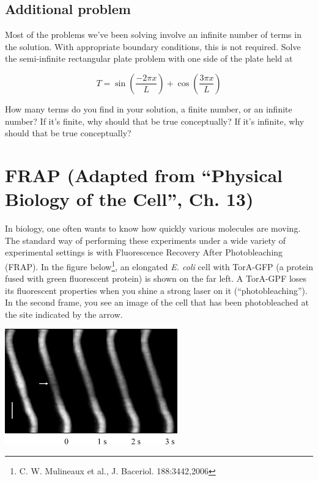 \documentclass[12pt]{article}
\begin{document}
\subsection{Additional problem} Most of the problems we've been solving involve an infinite number of terms in the solution. With appropriate boundary conditions, this is not required. Solve the semi-infinite rectangular plate problem with one side of the plate held at

\begin{equation}
  T = \sin\left(\frac{-2\pi x}{L}\right) + \cos\left(\frac{3\pi x}{L}\right)
\end{equation}

How many terms do you find in your solution, a finite number, or an infinite number? If it's finite, why should that be true conceptually? If it's infinite, why should that be true conceptually?


\section{FRAP (Adapted from ``Physical Biology of the Cell'', Ch. 13)}
In biology, one often wants to know how quickly various molecules are
moving. The standard way of performing these experiments under a wide
variety of experimental settings is with Fluorescence Recovery After
Photobleaching (FRAP). In the figure below\footnote{C. W. Mulineaux et
al., J. Baceriol. 188:3442,2006}, an elongated
\textit{E. coli} cell with TorA-GFP (a protein fused with green
fluorescent protein) is shown on the far left. A TorA-GPF loses its
fluorescent properties when you shine a strong laser on it
(``photobleaching''). In the second frame, you see an image of the
cell that has been photobleached at the site indicated by the
arrow. 

\includegraphics[height=50mm]{F5_large.pdf}
\end{document}
